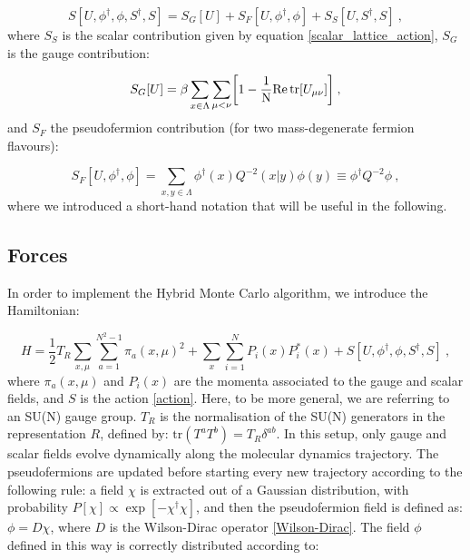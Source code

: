 \begin{equation}
S[U,\phi^{\dagger},\phi,S^{\dagger},S] = S_G[U] + S_F[U,\phi^{\dagger},\phi] + S_S[U,S^{\dagger},S] \: ,
\label{action}
\end{equation}
%
where $S_S$ is the scalar contribution given by equation \ref{scalar_lattice_action}, $S_G$ is the gauge contribution:

\begin{equation}
S_G[U] =  \beta \sum_{x \in \Lambda}  \sum_{\mu < \nu} \biggr[  1 - \frac{1}{\mathrm{N}} \mathrm{Re} \tr  [U_{\mu \nu}] \biggl ] \: ,
\end{equation}
%
and $S_F$ the pseudofermion contribution (for two mass-degenerate fermion flavours):

\begin{equation}
S_F[U,\phi^{\dagger},\phi]  = \sum_{x,y \in \Lambda} \phi^{\dagger}(x) Q^{-2}(x \vert y)\phi(y) \equiv \phi^{\dagger} Q^{-2} \phi \: ,
\end{equation}
%
where we introduced a short-hand notation that will be useful in the following.


\subsection{Forces}
\label{Forces}

In order to implement the Hybrid Monte Carlo algorithm, we introduce the Hamiltonian:

\begin{equation}
H = \frac{1}{2} T_R\sum_{x,\mu}\sum_{a=1}^{N^2-1} \pi_a (x, \mu)^2 + \sum_x \sum_{i=1}^N P_i(x)P^*_i(x) + S[U,\phi^{\dagger},\phi,S^{\dagger},S] \: ,
\end{equation}
%
where $\pi_a(x,\mu)$ and $P_i(x)$ are the momenta associated to the gauge and scalar fields, and $S$ is the action \ref{action}. Here, to be more general, we are referring to an SU(N) gauge group. $T_R$ is the normalisation of the SU(N) generators in the representation $R$, defined by: $\mathrm{tr} (T^aT^b) = T_R \delta^{ab}$.
In this setup, only gauge and scalar fields evolve dynamically along the molecular dynamics trajectory. The pseudofermions are updated before starting every new trajectory according to the following rule: a field $\chi$ is extracted out of a Gaussian distribution, with probability $P[\chi] \propto \exp [-\chi^{\dagger} \chi]$, and then the pseudofermion field is defined as: $\phi = D \chi$, where $D$ is the Wilson-Dirac operator \ref{Wilson-Dirac}. The field $\phi$ defined in this way is correctly distributed according to:


